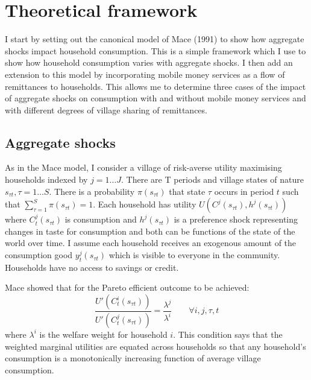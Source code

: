 \newpage
\section{Theoretical framework}
I start by setting out the canonical model of Mace (1991)  \nocite{mace1991full} to show how aggregate shocks impact household consumption. This is a simple framework which I use to show how household consumption varies with aggregate shocks. I then add an extension to this model by incorporating mobile money services as a flow of remittances to households. This allows me to determine three cases of the impact of aggregate shocks on consumption with and without mobile money services and with different degrees of village sharing of remittances.   

\subsection{Aggregate shocks}

As in the Mace model, I consider a village of risk-averse utility maximising households indexed by $j=1 \ldots J$. There are T periods and village states of nature $s_{\tau t}, \tau=1 \ldots S$. There is a probability $\pi(s_{\tau t})$ that state $\tau$ occurs in period $t$ such that $\sum_{\tau=1}^{S} \pi(s_{\tau t})=1$.  Each household has utility $U(C^j(s_{\tau t}),h^j(s_{\tau t}))$ where $C^j_t(s_{\tau t})$ is consumption and $h^j(s_{\tau t})$ is a preference shock representing changes in taste for consumption and both can be functions of the state of the world over time. I assume each household receives an exogenous amount of the consumption good $y_t^j(s_{\tau t})$ which is visible to everyone in the community. Households have no access to savings or credit. 

Mace showed that for the Pareto efficient outcome to be achieved:
\begin{equation} \label{eq: FOC1}
\frac{U'(C^i_t(s_{\tau t}))}{U'(C^j_t(s_{\tau t}))}=\frac{\lambda^j}{\lambda^i} \qquad \forall i, j, \tau, t
\end{equation}
where $\lambda^i$ is the welfare weight for household $i$. This condition says that the weighted marginal utilities are equated across households so that any household's consumption is a monotonically increasing function of average village consumption. 

